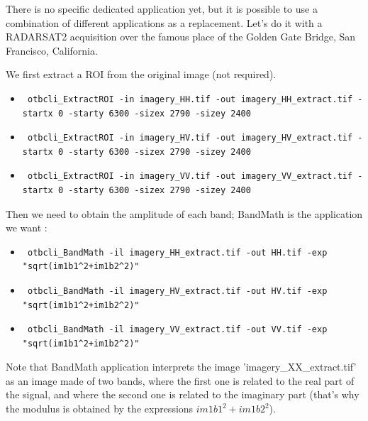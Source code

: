There is no specific dedicated application yet, but it is possible to use a combination of different applications as a replacement.
Let's do it with a RADARSAT2 acquisition over the famous place of the Golden Gate Bridge, San Francisco, California.

We first extract a ROI from the original image (not required). 


\begin{itemize}
\item \begin{verbatim} otbcli_ExtractROI -in imagery_HH.tif -out imagery_HH_extract.tif -startx 0 -starty 6300 -sizex 2790 -sizey 2400 \end{verbatim}
									  
\item \begin{verbatim} otbcli_ExtractROI -in imagery_HV.tif -out imagery_HV_extract.tif -startx 0 -starty 6300 -sizex 2790 -sizey 2400 \end{verbatim}
									  
\item \begin{verbatim} otbcli_ExtractROI -in imagery_VV.tif -out imagery_VV_extract.tif -startx 0 -starty 6300 -sizex 2790 -sizey 2400 \end{verbatim}
\end{itemize}

Then we need to obtain the amplitude of each band; BandMath is the application we want :

\begin{itemize}
\item \begin{verbatim} otbcli_BandMath -il imagery_HH_extract.tif -out HH.tif -exp "sqrt(im1b1^2+im1b2^2)" \end{verbatim}
									  
\item \begin{verbatim} otbcli_BandMath -il imagery_HV_extract.tif -out HV.tif -exp "sqrt(im1b1^2+im1b2^2)" \end{verbatim}
									  
\item \begin{verbatim} otbcli_BandMath -il imagery_VV_extract.tif -out VV.tif -exp "sqrt(im1b1^2+im1b2^2)" \end{verbatim}
\end{itemize}

Note that BandMath application interprets the image 'imagery\_XX\_extract.tif' as an image made of two bands, where the first one is related to the real part of the signal,
and where the second one is related to the imaginary part (that's why the modulus is obtained by the expressions $im1b1^2+im1b2^2$).


